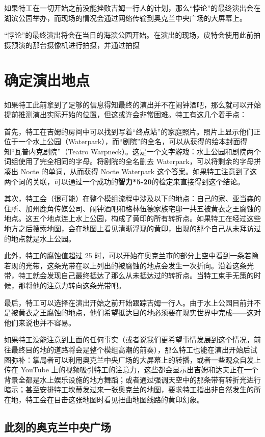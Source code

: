 如果特工在一切开始之前没能挫败吉姆一行人的计划，那么“悖论”的最终演出会在湖滨公园举办，而现场的情况会通过网络传输到奥克兰中央广场的大屏幕上。

“悖论”的最终演出将会在当日的海滨公园开始。在演出的现场，皮特会使用此前拍摄预演的那台摄像机进行拍摄，并通过拍摄

\section{确定演出地点}

如果特工此前拿到了足够的信息得知最终的演出并不在闹钟酒吧，那么就可以开始提前推测演出实际开始的位置，但这或许会非常困难。特工有这几个着手点：

首先，特工在吉姆的房间中可以找到写着“终点站”的家庭照片。照片上显示他们正位于一个水上公园（Waterpark），而“剧院”的全名，可以从获得的绘本封面得知“瓦普内克剧院”（Teatro Warpneck）。这是一个文字游戏：水上公园和剧院两个词组使用了完全相同的字母。将剧院的全名删去 Waterpark，可以将剩余的字母拼凑出 Nocte 的单词，从而获得 Nocte Waterpark 这个答案。如果特工注意到了这两个词的关联，可以通过一个成功的\textbf{智力*5-20}的检定来直接得到这个结论。

其次，特工会（很可能）在整个模组流程中涉及以下的地点：自己的家、亚当森的住所、加州鹿角传媒公司、闹钟酒吧和格林伍德家族宅邸一共五被黄衣之王腐蚀的地点。这五个地点连上水上公园，构成了黄印的所有转折点。如果特工在经过这些地方之后搜索地图，会在地图上看见清晰浮现的黄印，出现的那个自己从未拜访过的地点就是水上公园。

此外，特工的腐蚀值超过 25 时，可以开始在奥克兰市的部分上空中看到一条若隐若现的光带，这条光带在以上列出的被腐蚀的地点会发生一次折向。沿着这条光带，特工就会发现自己最终抵达了那么从未抵达过的转折点。当特工束手无策的时候，那将他的注意力转向这条光带吧。

最后，特工可以选择在演出开始之前开始跟踪吉姆一行人。由于水上公园目前并不是被黄衣之王腐蚀的地点，他们希望抵达目的地必须要在现实世界中完成——这对他们来说也并不容易。

如果特工没能注意到上面的任何事实（或者说我们更希望事情发展到这个情况，前往最终目的地的道路将会是整个模组高潮的前奏），那么特工也能在演出开始后试图弥补：掌局者可以利用奥克兰中央广场的大屏幕上的转播，或者一些观众自发上传在 YouTube 上的视频吸引特工的注意力，这些都会显示出吉姆和达夫正在一个背景全都是水上娱乐设施的地方舞蹈；或者通过强调天空中的那条带有转折光进行暗示；甚至安排特工坎蒂发过来一张奥克兰的地图，要求特工指出非自然发生的所在地，特工会在目击这张地图时看见扭曲地图线路的黄印幻象。

\subsection{此刻的奥克兰中央广场}

